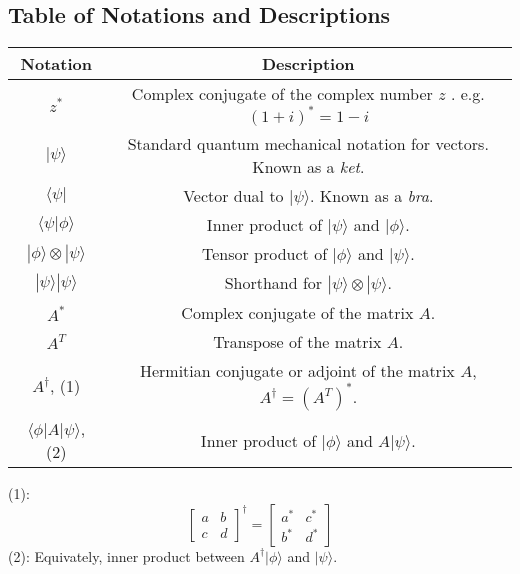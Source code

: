 \documentclass{article}
\begin{document}
\subsection{Table of Notations and Descriptions}
\begin{center}
    \begin{tabular}{ |c|c| } 
        \hline
        Notation & Description \\
        \hline
        $z^*$ & Complex conjugate of the complex number $z$ .
        e.g. \textbf{$
           (1+i)^* = 1-i$} \\
        \hline
        $|\psi\rangle$ & Standard quantum mechanical notation for vectors. Known as a \textit{ket}. \\
        \hline
        $\langle\psi|$ & Vector dual to $|\psi\rangle$. Known as a \textit{bra}. \\
        \hline
        $\langle\psi|\phi\rangle$ & Inner product of $|\psi\rangle$ and $|\phi\rangle$. \\
        \hline
        $|\phi\rangle \otimes |\psi\rangle$ & Tensor product of $|\phi\rangle$ and $|\psi\rangle$. \\
        \hline
        $|\psi\rangle |\psi\rangle$ & Shorthand for $|\psi\rangle \otimes |\psi\rangle$. \\
        \hline
        $A^*$ & Complex conjugate of the matrix $A$. \\
        \hline
        $A^T$ & Transpose of the matrix $A$. \\
        \hline
        $A^\dagger$, (1)& Hermitian conjugate or adjoint of the matrix $A$, $A^\dagger = (A^T)^\ast$. \\
        \hline
        $\langle \phi | A | \psi \rangle$, (2)& Inner product of $|\phi\rangle$ and $A|\psi\rangle$. \\
        \hline
    \end{tabular}
\end{center}  
(1): 
\begin{equation}
    \begin{bmatrix}
        a & b \\
        c & d   
    \end{bmatrix}^\dagger
    =
    \begin{bmatrix}
        a^* & c^* \\
        b^* & d^*
    \end{bmatrix}
\end{equation}
(2): Equivately, inner product between $A^\dagger|\phi\rangle$ and $|\psi\rangle$. \\     
\end{document}
